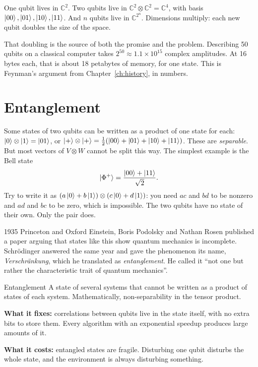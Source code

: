 One qubit lives in $\mathbb{C}^2$. Two qubits live in
$\mathbb{C}^2 \otimes \mathbb{C}^2 = \mathbb{C}^4$, with basis
$\ket{00}, \ket{01}, \ket{10}, \ket{11}$. And $n$ qubits live in
$\mathbb{C}^{2^n}$. Dimensions multiply: each new qubit doubles the size of the
space.

That doubling is the source of both the promise and the problem. Describing 50
qubits on a classical computer takes $2^{50} \approx 1.1\times10^{15}$ complex
amplitudes. At 16 bytes each, that is about 18 petabytes of memory, for one state.
This is Feynman's argument from Chapter~\ref{ch:history}, in numbers.

\section{Entanglement}

Some states of two qubits can be written as a product of one state for each:
$\ket{0}\otimes\ket{1} = \ket{01}$, or
$\ket{+}\otimes\ket{+} = \tfrac12(\ket{00} + \ket{01} + \ket{10} + \ket{11})$.
These are \emph{separable}. But most vectors of $V \otimes W$ cannot be split this
way. The simplest example is the Bell state
\[
  \ket{\Phi^+} = \frac{\ket{00} + \ket{11}}{\sqrt 2} .
\]
Try to write it as $(a\ket0 + b\ket1)\otimes(c\ket0 + d\ket1)$: you need $ac$ and
$bd$ to be nonzero and $ad$ and $bc$ to be zero, which is impossible. The two qubits
have no state of their own. Only the pair does.

\begin{history}{1935 \textperiodcentered{} Princeton and Oxford}
Einstein, Boris Podolsky and Nathan Rosen published a paper arguing that states
like this show quantum mechanics is incomplete. Schrödinger answered the same year
and gave the phenomenon its name, \emph{Verschränkung}, which he translated as
\emph{entanglement}. He called it ``not one but rather the characteristic trait of
quantum mechanics''.
\end{history}

\begin{concept}{Entanglement}
A state of several systems that cannot be written as a product of states of each
system. Mathematically, non-separability in the tensor product.

\textbf{What it fixes:} correlations between qubits live in the state itself,
with no extra bits to store them. Every algorithm with an exponential speedup
produces large amounts of it.

\textbf{What it costs:} entangled states are fragile. Disturbing one qubit
disturbs the whole state, and the environment is always disturbing something.
\end{concept}

